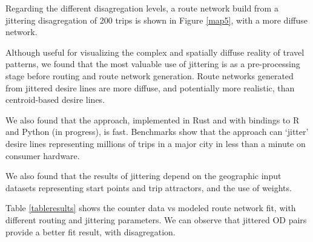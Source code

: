 \documentclass{isprs} %
\begin{document}
Regarding the different disagregation levels, a route network build from a jittering disagregation of 200 trips is shown in Figure \ref{map5}, with a more diffuse network.

Although useful for visualizing the complex and spatially diffuse reality of travel patterns, we found that the most valuable use of jittering is as a pre-processing stage before routing and route network generation.
Route networks generated from jittered desire lines are more diffuse, and potentially more realistic, than centroid-based desire lines.

We also found that the approach, implemented in Rust and with bindings to R and Python (in progress), is fast.
Benchmarks show that the approach can `jitter' desire lines representing millions of trips in a major city in less than a minute on consumer hardware.

We also found that the results of jittering depend on the geographic input datasets representing start points and trip attractors, and the use of weights.

Table \ref{tableresults} shows the counter data vs modeled route network fit, with different routing and jittering parameters. We can observe that jittered OD pairs provide a better fit result, with disagregation.
\end{document}
